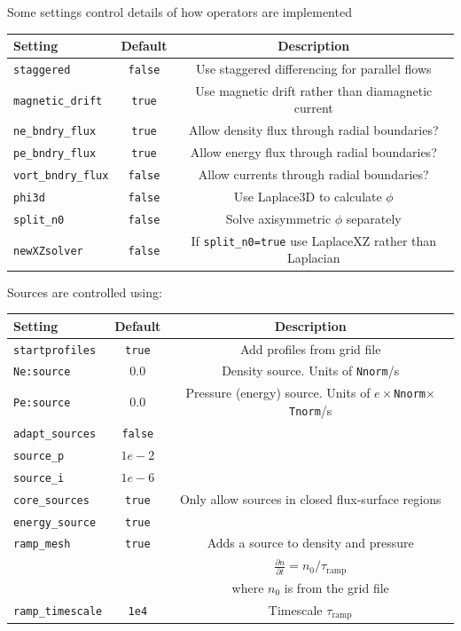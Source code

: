 \documentclass[12pt,a4paper]{article}
\begin{document}
Some settings control details of how operators are implemented
\begin{center}
\begin{tabular}{l c c}
  Setting & Default & Description \\
  \hline
  \texttt{staggered} & \texttt{false} & Use staggered differencing for parallel flows \\
  \texttt{magnetic\_drift} & \texttt{true} & Use magnetic drift rather than diamagnetic current \\
  \texttt{ne\_bndry\_flux} & \texttt{true} & Allow density flux through radial boundaries? \\
  \texttt{pe\_bndry\_flux} & \texttt{true} & Allow energy flux through radial boundaries? \\
  \texttt{vort\_bndry\_flux} & \texttt{false} & Allow currents through radial boundaries? \\
  \texttt{phi3d} & \texttt{false} & Use Laplace3D to calculate $\phi$ \\
  \texttt{split\_n0} & \texttt{false} & Solve axisymmetric $\phi$ separately \\
  \texttt{newXZsolver} & \texttt{false} & If \texttt{split\_n0=true} use LaplaceXZ rather than Laplacian  \\
  \hline
\end{tabular}
\end{center}

Sources are controlled using:
\begin{center}
\begin{tabular}{l c c}
  Setting & Default & Description \\
  \hline
  \texttt{startprofiles} & \texttt{true} & Add profiles from grid file \\
  \texttt{Ne:source} & $0.0$ & Density source. Units of \texttt{Nnorm}/s \\
  \texttt{Pe:source} & $0.0$ & Pressure (energy) source. Units of $e\times$\texttt{Nnorm}$\times$\texttt{Tnorm}/s\\
  \texttt{adapt\_sources} & \texttt{false} &  \\
  \texttt{source\_p} & $1e-2$ &  \\
  \texttt{source\_i} & $1e-6$ &  \\
  \texttt{core\_sources} & \texttt{true} & Only allow sources in closed flux-surface regions \\
  \texttt{energy\_source} & \texttt{true} &  \\
  \texttt{ramp\_mesh} & \texttt{true} &  Adds a source to density and pressure \\
  & & $\frac{\partial n}{\partial t} = n_0 / \tau_\textrm{ramp}$ \\
  & & where $n_0$ is from the grid file \\
  \texttt{ramp\_timescale} & \texttt{1e4} & Timescale $\tau_\textrm{ramp}$\\
  \hline
\end{tabular}
\end{center}
\end{document}
